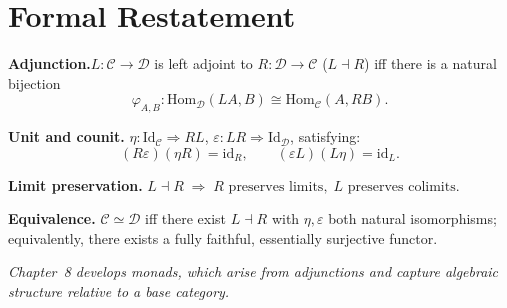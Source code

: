 \section*{Formal Restatement}

\begin{formalrestatement}
\textbf{Adjunction.}\quad $L : \mathcal{C} \to \mathcal{D}$ is left
adjoint to $R : \mathcal{D} \to \mathcal{C}$ ($L \dashv R$) iff there is a
natural bijection
\begin{equation*}
  \varphi_{A,B} : \mathrm{Hom}_\mathcal{D}(L A, B) \cong \mathrm{Hom}_\mathcal{C}(A, R B).
\end{equation*}

\medskip
\textbf{Unit and counit.}\quad
$\eta : \mathrm{Id}_\mathcal{C} \Rightarrow R L$,
$\varepsilon : L R \Rightarrow \mathrm{Id}_\mathcal{D}$, satisfying:
\begin{equation*}
  (R \varepsilon)(\eta R) = \mathrm{id}_R,
  \qquad
  (\varepsilon L)(L \eta) = \mathrm{id}_L.
\end{equation*}

\medskip
\textbf{Limit preservation.}\quad
$L \dashv R \;\Rightarrow\; R \text{ preserves limits},\; L \text{ preserves colimits}$.

\medskip
\textbf{Equivalence.}\quad
$\mathcal{C} \simeq \mathcal{D}$ iff there exist $L \dashv R$ with
$\eta, \varepsilon$ both natural isomorphisms; equivalently, there exists
a fully faithful, essentially surjective functor.

\medskip
\noindent\textit{Chapter~8 develops monads, which arise from adjunctions
and capture algebraic structure relative to a base category.}
\end{formalrestatement}
